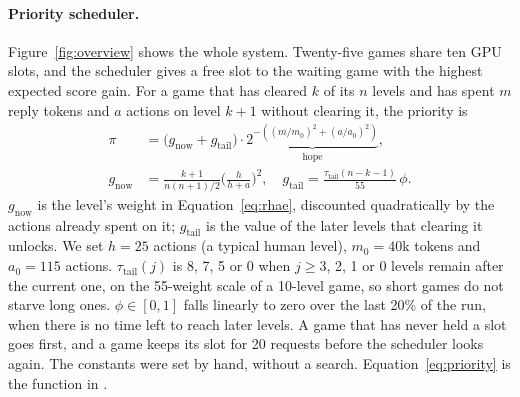 \paragraph{Priority scheduler.}
Figure~\ref{fig:overview} shows the whole system. Twenty-five games share ten GPU slots, and the scheduler gives a free slot to the waiting game with the highest expected score gain. For a game that has cleared $k$ of its $n$ levels and has spent $m$ reply tokens and $a$ actions on level $k+1$ without clearing it, the priority is
\begin{align}
\pi &= \big(g_{\text{now}} + g_{\text{tail}}\big)\cdot \underbrace{2^{-\left((m/m_0)^{2} + (a/a_0)^{2}\right)}}_{\text{hope}}, \label{eq:priority}\\
g_{\text{now}} &= \frac{k+1}{n(n+1)/2}\Big(\frac{h}{h+a}\Big)^{2}, \quad g_{\text{tail}} = \frac{\tau_{\text{tail}}(n-k-1)}{55}\,\phi. \nonumber
\end{align}
$g_{\text{now}}$ is the level's weight in Equation~\eqref{eq:rhae}, discounted quadratically by the actions already spent on it; $g_{\text{tail}}$ is the value of the later levels that clearing it unlocks. We set $h = 25$ actions (a typical human level), $m_0 = 40$k tokens and $a_0 = 115$ actions. $\tau_{\text{tail}}(j)$ is 8, 7, 5 or 0 when $j \ge 3$, 2, 1 or 0 levels remain after the current one, on the 55-weight scale of a 10-level game, so short games do not starve long ones. $\phi \in [0, 1]$ falls linearly to zero over the last 20\% of the run, when there is no time left to reach later levels. A game that has never held a slot goes first, and a game keeps its slot for 20 requests before the scheduler looks again. The constants were set by hand, without a search. Equation~\eqref{eq:priority} is the function  in .

